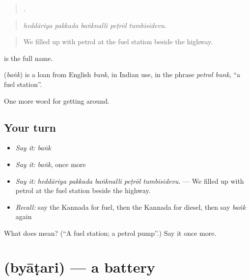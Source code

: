 \begin{quote}
    .
\end{quote}

\begin{quote}
\emph{heddāriya pakkada baṅknalli peṭrōl tumbisidevu.}
\end{quote}

\begin{quote}
We filled up with petrol at the fuel station beside the highway.
\end{quote}

  is the full name.

\begin{cousinweb}
\textbf{} (\emph{baṅk}) is a loan from English \emph{bunk}, in Indian use, in the phrase \emph{petrol bunk}, \textquotedblleft{}a fuel station\textquotedblright{}.
\end{cousinweb}

\begin{grammarlens}[title={What you've built}]
One more word for getting around.
\end{grammarlens}

\subsection*{Your turn}
\begin{itemize}
\raggedright
  \item \emph{Say it:} \emph{baṅk}
  \item \emph{Say it:} \emph{baṅk}, once more
  \item \emph{Say it:} \emph{heddāriya pakkada baṅknalli peṭrōl tumbisidevu.} — We filled up with petrol at the fuel station beside the highway.
  \item \emph{Recall:} say the Kannada for fuel, then the Kannada for diesel, then say \emph{baṅk} again
\end{itemize}

\begin{tcolorbox}[breakable,colback=teal!4,colframe=teal!35!black,title={Before you move on}]
What does  mean? (\textquotedblleft{}A fuel station; a petrol pump\textquotedblright{}.) Say it once more.
\end{tcolorbox}
\section[\texorpdfstring{\kn{ಬ್ಯಾಟರಿ} (byāṭari)}{ಬ್ಯಾಟರಿ (byāṭari)}]{ (byāṭari) — a battery}

